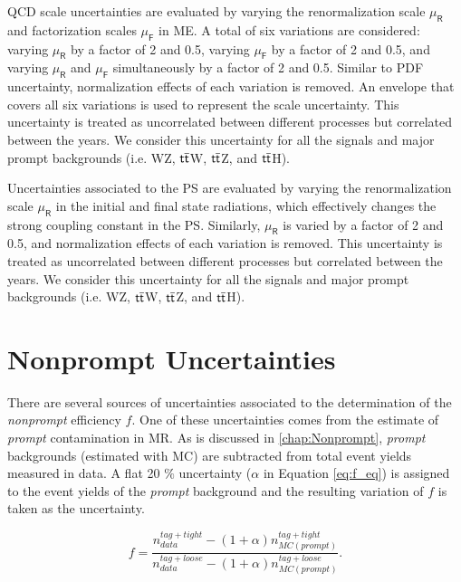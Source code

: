 \ac{QCD} scale uncertainties are evaluated by varying the renormalization scale $\mu_\textsf{R}$ and factorization scales $\mu_\textsf{F}$ in \ac{ME}.  A total of six variations are considered: varying $\mu_\textsf{R}$ by a factor of 2 and 0.5, varying $\mu_\textsf{F}$ by a factor of 2 and 0.5, and varying $\mu_\textsf{R}$ and $\mu_\textsf{F}$ simultaneously by a factor of 2 and 0.5. Similar to PDF uncertainty, normalization effects of each variation is removed. An envelope that covers all six variations is used to represent the scale uncertainty. This uncertainty is treated as uncorrelated between different processes but correlated between the years. We consider this uncertainty for all the signals and major prompt backgrounds (i.e. WZ, $\textsf{t}\overline{\textsf{t}}$W, $\textsf{t}\overline{\textsf{t}}$Z, and $\textsf{t}\overline{\textsf{t}}$H).

Uncertainties associated to the \ac{PS} are evaluated by varying the renormalization scale $\mu_\textsf{R}$ in the initial and final state radiations, which effectively changes the strong coupling constant in the \ac{PS}. Similarly, $\mu_\textsf{R}$ is varied by a factor of 2 and 0.5, and normalization effects of each variation is removed. This uncertainty is treated as uncorrelated between different processes but correlated between the years.  We consider this uncertainty for all the signals and major prompt backgrounds (i.e. WZ, $\textsf{t}\overline{\textsf{t}}$W, $\textsf{t}\overline{\textsf{t}}$Z, and $\textsf{t}\overline{\textsf{t}}$H).

\section{Nonprompt Uncertainties}
\label{sec:NonUnc}

There are several sources of uncertainties associated to the determination of the \emph{nonprompt} efficiency $f$. One of these uncertainties comes from the estimate of \emph{prompt} contamination in \ac{MR}. As is discussed in \autoref{chap:Nonprompt}, \emph{prompt} backgrounds (estimated with \ac{MC}) are subtracted from total event yields measured in data. A flat 20 $\%$ uncertainty ($\alpha$ in Equation \ref{eq:f_eq}) is assigned to the event yields of the \emph{prompt} background and the resulting variation of $f$ is taken as the uncertainty.

\begin{equation}
f=\frac{n_{data}^{tag+tight}-(1+\alpha)n_{MC(prompt)}^{tag+tight}}{n_{data}^{tag+loose}-(1+\alpha)n_{MC(prompt)}^{tag+loose}}.
\label{eq:f_eq}
\end{equation}  

